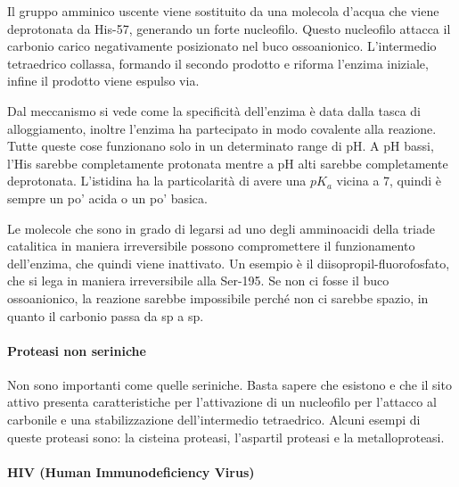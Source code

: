 
Il gruppo amminico uscente viene sostituito da una molecola d'acqua che viene deprotonata da His-57, generando un forte nucleofilo. Questo nucleofilo attacca il carbonio carico negativamente posizionato nel buco ossoanionico.
L'intermedio tetraedrico collassa, formando il secondo prodotto e riforma l'enzima iniziale, infine il prodotto viene espulso via.


Dal meccanismo si vede come la specificità dell'enzima è data dalla tasca di alloggiamento, inoltre l'enzima ha partecipato in modo covalente alla reazione.
Tutte queste cose funzionano solo in un determinato range di pH. A pH bassi, l'His sarebbe completamente protonata mentre a pH alti sarebbe completamente deprotonata. L'istidina ha la particolarità di avere una $pK_a$ vicina a 7, quindi è sempre un po' acida o un po' basica.


Le molecole che sono in grado di legarsi ad uno degli amminoacidi della triade catalitica in maniera irreversibile possono compromettere il funzionamento dell'enzima, che quindi viene inattivato. Un esempio è il diisopropil-fluorofosfato, che si lega in maniera irreversibile alla Ser-195.
Se non ci fosse il buco ossoanionico, la reazione sarebbe impossibile perché non ci sarebbe spazio, in quanto il carbonio passa da sp a sp.



\paragraph{Proteasi non seriniche}

Non sono importanti come quelle seriniche. Basta sapere che esistono e che il sito attivo presenta caratteristiche per l'attivazione di un nucleofilo per l'attacco al carbonile e una stabilizzazione dell'intermedio tetraedrico. Alcuni esempi di queste proteasi sono: la cisteina proteasi, l'aspartil proteasi e la metalloproteasi.

\paragraph{HIV (Human Immunodeficiency Virus)}

